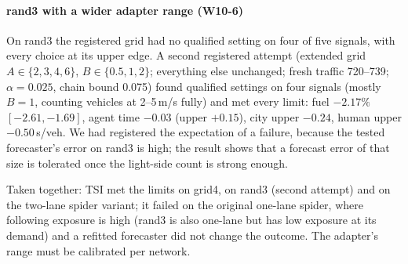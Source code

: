\paragraph{rand3 with a wider adapter range (W10-6)} On rand3 the registered grid had no qualified setting on four of five signals, with
every choice at its upper edge. A second registered attempt (extended grid $A\in\{2,3,4,6\}$, $B\in\{0.5,1,2\}$; everything else unchanged;
fresh traffic 720--739; $\alpha=0.025$, chain bound 0.075) found qualified settings on four signals (mostly $B=1$, counting vehicles at
2--5\,m/s fully) and met every limit: fuel $-2.17\%$ $[-2.61,-1.69]$, agent time $-0.03$ (upper $+0.15$), city upper $-0.24$, human upper
$-0.50$\,s/veh. We had registered the expectation of a failure, because the tested forecaster's error on rand3 is high; the result shows that a
forecast error of that size is tolerated once the light-side count is strong enough.

Taken together: TSI met the limits on grid4, on rand3 (second attempt) and on the two-lane spider variant; it failed on the original
one-lane spider, where following exposure is high (rand3 is also one-lane but has low exposure at its demand) and a refitted forecaster
did not change the outcome. The adapter's range must be calibrated per network.

